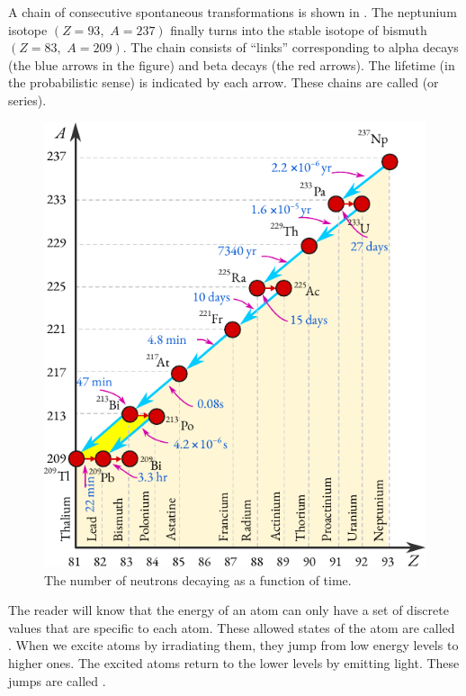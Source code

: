 A chain of consecutive spontaneous transformations is shown in
. The neptunium isotope  $(Z = 93, \,\, A = 237)$ finally turns into the stable isotope of bismuth  $(Z = 83, \,\,A = 209)$. The chain consists of ``links'' corresponding to alpha decays (the blue arrows in the figure) and beta decays (the red arrows). The lifetime (in the probabilistic sense) is indicated by each arrow. These chains are called  (or series).

\begin{figure}[!ht]
\centering
\includegraphics[width=0.8\tfwidth]{figures/spont-fission.pdf}
\caption{The number of neutrons decaying as a function of time.\label{spon-fission}}
\end{figure}

 The reader will
know that the energy of an atom can only have a set of discrete values
that are specific to each atom. These allowed states of the atom are
called . When we excite atoms by irradiating them, they
jump from low energy levels to higher ones. The excited atoms return to
the lower levels by emitting light. These jumps are called .



